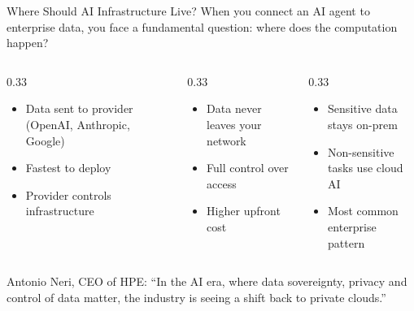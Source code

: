 \documentclass[aspectratio=169]{beamer}
\begin{document}
\begin{frame}{Where Should AI Infrastructure Live?}
When you connect an AI agent to enterprise data, you face a fundamental question: \alert{where does the computation happen?}
\vspace{0.3cm}
\begin{columns}[T]
\begin{column}{0.33\textwidth}
\begin{shadedbox}[title=\textbf{Public Cloud AI}]
\begin{itemize}\small
  \item Data sent to provider (OpenAI, Anthropic, Google)
  \item Fastest to deploy
  \item Provider controls infrastructure
\end{itemize}
\end{shadedbox}
\end{column}
\begin{column}{0.33\textwidth}
\begin{shadedbox}[title=\textbf{Private / On-Prem AI}]
\begin{itemize}\small
  \item Data never leaves your network
  \item Full control over access
  \item Higher upfront cost
\end{itemize}
\end{shadedbox}
\end{column}
\begin{column}{0.33\textwidth}
\begin{shadedbox}[title=\textbf{Hybrid}]
\begin{itemize}\small
  \item Sensitive data stays on-prem
  \item Non-sensitive tasks use cloud AI
  \item Most common enterprise pattern
\end{itemize}
\end{shadedbox}
\end{column}
\end{columns}
\vspace{0.3cm}
Antonio Neri, CEO of HPE: ``In the AI era, where data sovereignty, privacy and control of data matter, the industry is seeing a shift back to private clouds.''
\end{frame}
\end{document}
